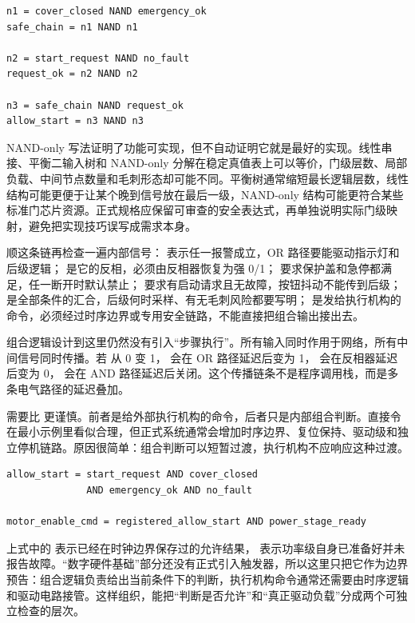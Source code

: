 \begin{lstlisting}
n1 = cover_closed NAND emergency_ok
safe_chain = n1 NAND n1

n2 = start_request NAND no_fault
request_ok = n2 NAND n2

n3 = safe_chain NAND request_ok
allow_start = n3 NAND n3
\end{lstlisting}

NAND-only 写法证明了功能可实现，但不自动证明它就是最好的实现。线性串接、平衡二输入树和 NAND-only 分解在稳定真值表上可以等价，门级层数、局部负载、中间节点数量和毛刺形态却可能不同。平衡树通常缩短最长逻辑层数，线性结构可能更便于让某个晚到信号放在最后一级，NAND-only 结构可能更符合某些标准门芯片资源。正式规格应保留可审查的安全表达式，再单独说明实际门级映射，避免把实现技巧误写成需求本身。

顺这条链再检查一遍内部信号： 表示任一报警成立，OR 路径要能驱动指示灯和后级逻辑； 是它的反相，必须由反相器恢复为强 0/1； 要求保护盖和急停都满足，任一断开时默认禁止； 要求有启动请求且无故障，按钮抖动不能传到后级； 是全部条件的汇合，后级何时采样、有无毛刺风险都要写明； 是发给执行机构的命令，必须经过时序边界或专用安全链路，不能直接把组合输出接出去。

组合逻辑设计到这里仍然没有引入“步骤执行”。所有输入同时作用于网络，所有中间信号同时传播。若  从 0 变 1， 会在 OR 路径延迟后变为 1， 会在反相器延迟后变为 0， 会在 AND 路径延迟后关闭。这个传播链条不是程序调用栈，而是多条电气路径的延迟叠加。

 需要比  更谨慎。前者是给外部执行机构的命令，后者只是内部组合判断。直接令  在最小示例里看似合理，但正式系统通常会增加时序边界、复位保持、驱动级和独立停机链路。原因很简单：组合判断可以短暂过渡，执行机构不应响应这种过渡。

\begin{lstlisting}
allow_start = start_request AND cover_closed
              AND emergency_ok AND no_fault

motor_enable_cmd = registered_allow_start AND power_stage_ready
\end{lstlisting}

上式中的  表示已经在时钟边界保存过的允许结果， 表示功率级自身已准备好并未报告故障。“数字硬件基础”部分还没有正式引入触发器，所以这里只把它作为边界预告：组合逻辑负责给出当前条件下的判断，执行机构命令通常还需要由时序逻辑和驱动电路接管。这样组织，能把“判断是否允许”和“真正驱动负载”分成两个可独立检查的层次。

